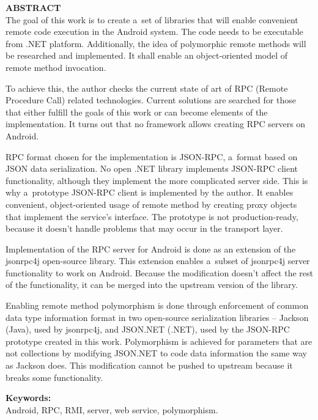 \documentclass[twoside,a4paper]{book}
\begin{document}
{\noindent \large \textbf{ABSTRACT}} \\
The goal of this work is to create a~set of libraries that will enable convenient remote code execution in the Android system.
The code needs to be executable from .NET platform.
Additionally, the idea of polymorphic remote methods will be researched and implemented.
It shall enable an object-oriented model of remote method invocation.

To achieve this, the author checks the current state of art of RPC (Remote Procedure Call) related technologies.
Current solutions are searched for those that either fulfill the goals of this work or can become elements of the implementation.
It turns out that no framework allows creating RPC servers on Android.

RPC format chosen for the implementation is JSON-RPC, a~format based on JSON data serialization.
No open .NET library implements JSON-RPC client functionality, although they implement the more complicated server side.
This is why a~prototype JSON-RPC client is implemented by the author. It enables convenient, object-oriented usage of remote method by creating proxy objects that implement the service's interface.
The prototype is not production-ready, because it doesn't handle problems that may occur in the transport layer. 

Implementation of the RPC server for Android is done as an extension of the jsonrpc4j open-source library.
This extension enables a~subset of jsonrpc4j server functionality to work on Android.
Because the modification doesn't affect the rest of the functionality, it can be merged into the upstream version of the library.

Enabling remote method polymorphism is done through enforcement of common data type information format in two open-source serialization libraries -- Jackson (Java), used by jsonrpc4j, and JSON.NET (.NET), used by the JSON-RPC prototype created in this work.
Polymorphism is achieved for parameters that are not collections by modifying JSON.NET to code data information the same way as Jackson does.
This modification cannot be pushed to upstream because it breaks some functionality.

\noindent\textbf{Keywords:} \\
Android, RPC, RMI, server, web service, polymorphism.
\clearpage

\tableofcontents
\end{document}
